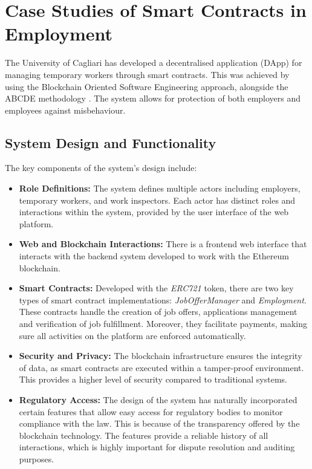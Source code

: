 \section{Case Studies of Smart Contracts in Employment}

The University of Cagliari has developed a decentralised application (DApp) for managing temporary workers through smart contracts. This was achieved by using the Blockchain Oriented Software Engineering approach, alongside the ABCDE methodology \cite{lallaiETAL2020software}. The system allows for protection of both employers and employees against misbehaviour.

\subsection{System Design and Functionality}

The key components of the system's design include:

\begin{itemize}
    \item \textbf{Role Definitions:} The system defines multiple actors including employers, temporary workers, and work inspectors. Each actor has distinct roles and interactions within the system, provided by the user interface of the web platform.
    \item \textbf{Web and Blockchain Interactions:} There is a frontend web interface that interacts with the backend system developed to work with the Ethereum blockchain. 
    \item \textbf{Smart Contracts:} Developed with the \textit{ERC721} token, there are two key types of smart contract implementations: \textit{JobOfferManager} and \textit{Employment}. These contracts handle the creation of job offers, applications management and verification of job fulfillment. Moreover, they facilitate payments, making sure all activities on the platform are enforced automatically.
    \item \textbf{Security and Privacy:} The blockchain infrastructure ensures the integrity of data, as smart contracts are executed within a tamper-proof environment. This provides a higher level of security compared to traditional systems.
    \item \textbf{Regulatory Access:} The design of the system has naturally incorporated certain features that allow easy access for regulatory bodies to monitor compliance with the law. This is because of the transparency offered by the blockchain technology. The features provide a reliable history of all interactions, which is highly important for dispute resolution and auditing purposes.
\end{itemize}

